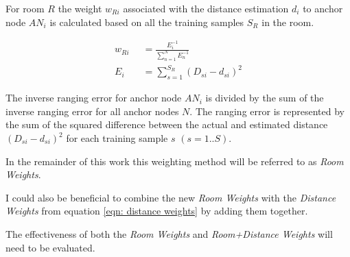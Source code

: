 For room $R$ the weight $w_{Ri}$ associated with the distance estimation $d_i$ to anchor node $AN_i$ is calculated based on all the training samples $S_R$ in the room.

\begin{equation}
\begin{split}
w_{Ri}\;\; & =\frac{E_i^{-1}}{\sum_{n=1}^{N}{E_n^{-1}}}\\
E_i\;\; & = \sum_{s=1}^{S_R}{(D_{si}-d_{si})^2}
\end{split}
\label{eqn: Room Weights}
\end{equation}

The inverse ranging error for anchor node $AN_i$ is divided by the sum of the inverse ranging error for all anchor nodes $N$. The ranging error is represented by the sum of the squared difference between the actual and estimated distance $(D_{si}-d_{si})^2$ for each training sample $s$ $(s=1..S)$.

In the remainder of this work this weighting method will be referred to as \emph{Room Weights}.

I could also be beneficial to combine the new \emph{Room Weights} with the \emph{Distance Weights} from equation \ref{eqn: distance weights} by adding them together.


The effectiveness of both the \emph{Room Weights} and \emph{Room+Distance Weights} will need to be evaluated.
